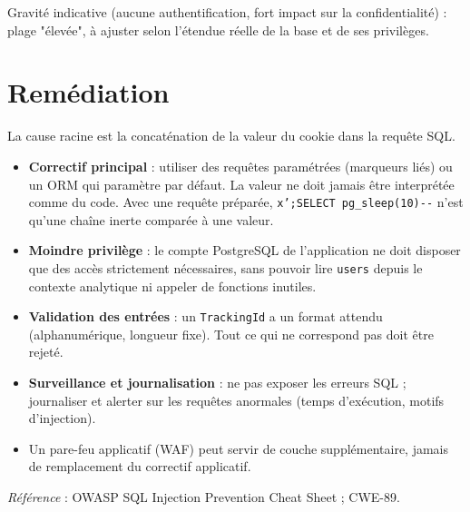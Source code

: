\documentclass[11pt,a4paper]{article}
\begin{document}
Gravité indicative (aucune authentification, fort impact sur la
confidentialité) : plage "élevée", à ajuster selon l'étendue réelle de
la base et de ses privilèges.

\section{Remédiation}
La cause racine est la concaténation de la valeur du cookie dans la requête
SQL.

\begin{itemize}
  \item \textbf{Correctif principal} : utiliser des requêtes paramétrées (marqueurs liés) ou un ORM qui paramètre par défaut. La valeur ne doit jamais être interprétée comme du code. Avec une requête préparée, \texttt{x';SELECT pg\_sleep(10){-}{-}} n'est qu'une chaîne inerte comparée à une valeur.
  \item \textbf{Moindre privilège} : le compte PostgreSQL de l'application ne doit disposer que des accès strictement nécessaires, sans pouvoir lire \texttt{users} depuis le contexte analytique ni appeler de fonctions inutiles.
  \item \textbf{Validation des entrées} : un \texttt{TrackingId} a un format attendu (alphanumérique, longueur fixe). Tout ce qui ne correspond pas doit être rejeté.
  \item \textbf{Surveillance et journalisation} : ne pas exposer les erreurs SQL ; journaliser et alerter sur les requêtes anormales (temps d'exécution, motifs d'injection).
  \item Un pare-feu applicatif (WAF) peut servir de couche supplémentaire, jamais de remplacement du correctif applicatif.
\end{itemize}

\vspace{4pt}
\noindent\emph{Référence} : OWASP SQL Injection Prevention Cheat Sheet ; CWE-89.
\end{document}

